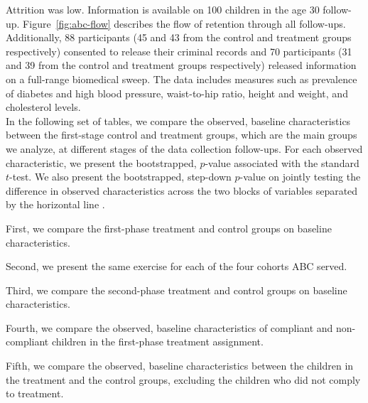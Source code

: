 \begin{appendices}
\noindent Attrition was low. Information is available on 100 children in the age 30 follow-up. Figure~\ref{fig:abc-flow} describes the flow of retention through all follow-ups. Additionally, 88 participants (45 and 43 from the control and treatment groups respectively) consented to release their criminal records and 70 participants (31 and 39 from the control and treatment groups respectively) released information on a full-range biomedical sweep. The data includes measures such as prevalence of diabetes and high blood pressure, waist-to-hip ratio, height and weight, and cholesterol levels.\\ 

\noindent In the following set of tables, we compare the observed, baseline characteristics between the first-stage control and treatment groups, which are the main groups we analyze, at different stages of the data collection follow-ups. For each observed characteristic, we present the bootstrapped, $p$-value associated with the standard $t$-test. We also present the bootstrapped, step-down $p$-value on jointly testing the difference in observed characteristics across the two blocks of variables separated by the horizontal line \citep{Lehmann_Romano_2005_testing}.

\noindent First, we compare the first-phase treatment and control groups on baseline characteristics. 



\noindent Second, we present the same exercise for each of the four cohorts ABC served.









\noindent Third, we compare the second-phase treatment and control groups on baseline characteristics. 



\noindent Fourth, we compare the observed, baseline characteristics of compliant and non-compliant children in the first-phase treatment assignment.



\noindent Fifth, we compare the observed, baseline characteristics between the children in the treatment and the control groups, excluding the children who did not comply to treatment.


\end{appendices}
